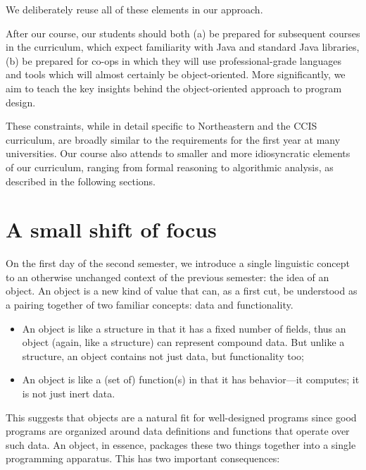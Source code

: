 \documentclass[submission,copyright]{eptcs}
\begin{document}
\noindent
We deliberately reuse all of these elements in our approach.

After our course, our students should both (a) be prepared for
subsequent courses in the curriculum, which expect familiarity with
Java and standard Java libraries, (b) be prepared for co-ops in which
they will use professional-grade languages and tools which will
almost certainly be object-oriented.  More significantly, we aim to
teach the key insights behind the object-oriented approach to program
design.

These constraints, while in detail specific to Northeastern and the
CCIS curriculum, are broadly similar to the requirements for the first
year at many universities.  Our course also attends to smaller and
more idiosyncratic elements of our curriculum, ranging from formal
reasoning to algorithmic analysis, as described in the following
sections.



\section{A small shift of focus}
\label{sec:shift}

On the first day of the second semester, we introduce a single
linguistic concept to an otherwise unchanged context of the previous
semester: the idea of an object.
%
An object is a new kind of value that can, as a first cut, be
understood as a pairing together of two familiar concepts: data and
functionality.

\begin{itemize}
\item An object is like a structure in that it has a fixed number of
fields, thus an object (again, like a structure) can represent
compound data. But unlike a structure, an object contains not just
data, but functionality too;

\item An object is like a (set of) function(s) in that it has behavior---it computes; it is
not just inert data.
\end{itemize}

This suggests that objects are a natural fit for well-designed programs
since good programs are organized around data definitions and
functions that operate over such data. An object, in essence, packages
these two things together into a single programming apparatus. This
has two important consequences:
\end{document}
